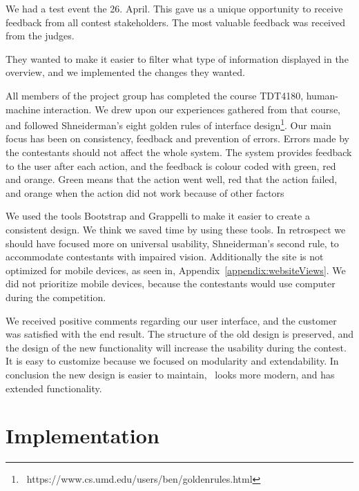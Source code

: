 We had a test event the 26. April. This gave us a unique opportunity to
receive feedback from all contest stakeholders. The most valuable
feedback was received from the judges.

They wanted to make it easier to filter what type of information
displayed in the overview, and we implemented the changes they wanted. 

All members of the project group has completed the course TDT4180,
human-machine interaction. We drew upon our experiences gathered from
that course, and followed Shneiderman's eight golden
rules of interface
design\footnote{\ https://www.cs.umd.edu/users/ben/goldenrules.html}.
Our main focus has been on consistency, feedback and prevention of
errors. Errors made by the contestants should not affect the whole
system. The system provides feedback to the user after each action, and
the feedback is colour coded with green, red and orange. Green means
that the action went well, red that the action failed, and orange when
the action did not work because of other factors

We used the tools Bootstrap and Grappelli to make it easier to create a
consistent design. We think we saved time by using these tools. In
retrospect we should have focused more on universal usability,
Shneiderman's second rule, to accommodate contestants
with impaired vision. Additionally the site is not optimized for mobile
devices, as seen in, Appendix~\ref{appendix:websiteViews}. We did not prioritize mobile devices,
because the contestants would use computer during the competition. 

We received positive comments regarding our user interface, and the
customer was satisfied with the end result. The structure of the old
design is preserved, and the design of the new functionality will
increase the usability during the contest. It is easy to customize
because we focused on modularity and extendability. In conclusion the
new design is easier to maintain, \ looks more modern, and has extended
functionality. \ 

\pagebreak
\section{Implementation}


